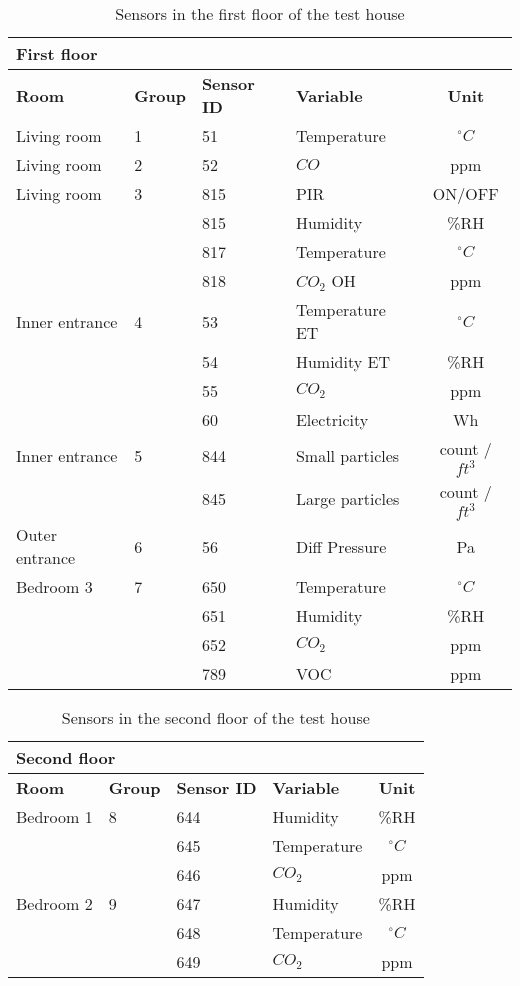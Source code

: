 

\begin{table}
  \caption{Sensors in the first floor of the test house} 
  \begin{tabular}{l | l | l | l | c}
    \multicolumn{4}{l}{\textbf{First floor}} \\
    \hline
   	\textbf{Room} & \textbf{Group} & \textbf{Sensor ID} & \textbf{Variable} & \textbf{Unit} \\
    \hline
    Living room & 1 & 51 & Temperature & $^\circ C$ \\
    \hline
    Living room & 2 & 52 & $CO$ & ppm \\
    \hline
    Living room & 3 & 815 & PIR & ON/OFF \\
      &  & 815 & Humidity & \%RH \\
      &  & 817 & Temperature & $^\circ C$ \\
      &  & 818 & $CO_2$ OH & ppm \\
    \hline
    Inner entrance & 4 & 53 & Temperature ET & $^\circ C$ \\
      &  & 54 & Humidity ET & \%RH \\
      &  & 55 & $CO_2$ & ppm \\
      &  & 60 & Electricity & Wh \\
    \hline
    Inner entrance & 5 & 844 & Small particles & count / $ft^3$ \\
     & & 845 & Large particles & count / $ft^3$ \\
    \hline
    Outer entrance & 6 & 56 & Diff Pressure & Pa \\
    \hline
    Bedroom 3 & 7 & 650 & Temperature & $^\circ C$ \\
     & & 651 & Humidity & \%RH \\
     & & 652 & $CO_2$ & ppm \\
     & & 789 & VOC & ppm \\
  \end{tabular}
  \label{table:floor1}
\end{table}

\begin{table}
  \caption{Sensors in the second floor of the test house} 
  \begin{tabular}{l | l | l | l | c}
    \multicolumn{4}{l}{\textbf{Second floor}} \\
    \hline
   	\textbf{Room} & \textbf{Group} & \textbf{Sensor ID} & \textbf{Variable} & \textbf{Unit} \\
    \hline
    Bedroom 1 & 8 & 644 & Humidity & \%RH \\
     & & 645 & Temperature & $^\circ C$ \\
     & & 646 & $CO_2$ & ppm \\
    \hline
    Bedroom 2 & 9 & 647 & Humidity & \%RH \\
     & & 648 & Temperature & $^\circ C$ \\
     & & 649 & $CO_2$ & ppm \\
    \hline
  \end{tabular}
  \label{table:floor2}
\end{table}


